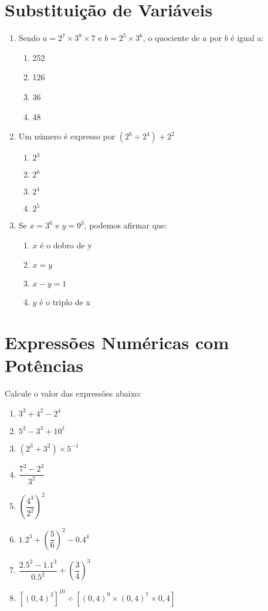 \documentclass[a4paper,12pt]{article}
\begin{document}
\begin{multicols}{2}
		\section*{Substituição de Variáveis}
		\begin{enumerate}
			\item Sendo $a=2^{7} \times 3^{8} \times 7$ e $b= 2^{5} \times 3^{6}$, o quociente de $a$ por $b$ é igual a:	
			\begin{multicols}{2}	
				\begin{enumerate}				
					\item 252   \item 126
					\item 36 	\item 48
				\end{enumerate}
			\end{multicols}
			\item Um número é expresso por $(2^{6} \div 2^{4}) + 2^{2}$
			\begin{multicols}{2}	
				\begin{enumerate}				
					\item $2^{3}$   \item $2^{0}$
					\item $2^{4}$ 	\item $2^{5}$
				\end{enumerate}
			\end{multicols}
			\item Se $x=3^{6}$ e $y=9^{3}$, podemos afirmar que:
			
				\begin{enumerate}				
					\item $x$ é o dobro de y   \item $x=y$
					\item $x-y=1$	\item $y$ é o triplo de x
				\end{enumerate}
		
		\end{enumerate}
		
		
		\section*{Expressões Numéricas com Potências}
		Calcule o valor das expressões abaixo:
		\begin{enumerate}
			\item $3^3 + 4^2 - 2^4$
			\item $5^2 - 3^3 + 10^1$
			\item $\left(2^3 + 3^2\right) \times 5^{-1}$
			\item $\dfrac{7^2 - 2^3}{3^2}$
			\item $\left(\dfrac{4^3}{2^2}\right)^2$
			\item $1.2^3 + \left(\dfrac{5}{6}\right)^2 - 0.4^4$
			\item $\dfrac{2.5^2 - 1.1^3}{0.5^2} + \left(\dfrac{3}{4}\right)^3$
			\item $ [ (0,4)^{2} ]^{10} \div [ (0,4)^{9} \times (0,4)^{7} \times 0,4] $
		\end{enumerate}
		

\end{multicols}
\end{document}
